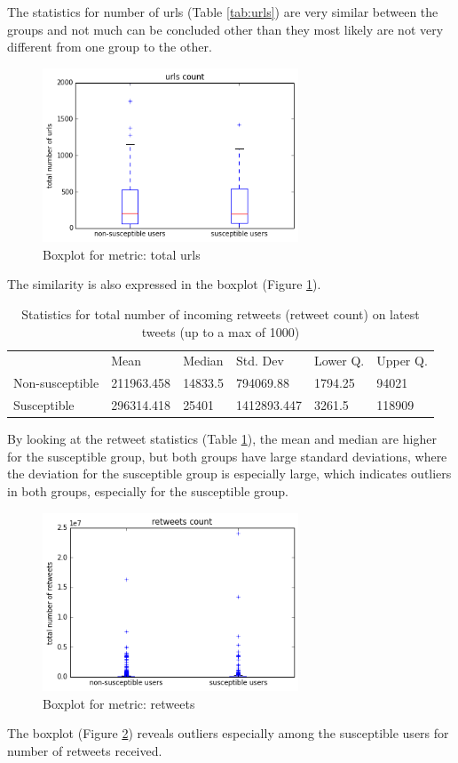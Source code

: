 \documentclass[10pt]{IEEEtran}
\begin{document}
The statistics for number of urls (Table \ref{tab:urls}) are very similar between the groups and not much can be concluded other than they most likely are not very different from one group to the other.
\begin{figure}[H]
  \centering
  \includegraphics[width=3.0in]{total_urls_boxplot}
  \caption{Boxplot for metric: total urls}
  \label{fig:total_urls_boxplot}
\end{figure}
The similarity is also expressed in the boxplot (Figure \ref{fig:total_urls_boxplot}).
\begin{table}[H]

\begin{tabular}{llllll}
\textbf{}       & Mean       & Median  & Std. Dev    & Lower Q. & Upper Q. \\
Non-susceptible & 211963.458 & 14833.5 & 794069.88   & 1794.25    & 94021  \\
Susceptible     & 296314.418 & 25401   & 1412893.447 & 3261.5   &  118909 
\end{tabular}
\caption{Statistics for total number of incoming retweets (retweet count) on latest tweets (up to a max of 1000)}
\label{tab:retweets}
\end{table}
By looking at the retweet statistics (Table \ref{tab:retweets}), the mean and median are higher for the susceptible group, but both groups have large standard deviations, where the deviation for the susceptible group is especially large, which indicates outliers in both groups, especially for the susceptible group.
\begin{figure}[H]
  \centering
  \includegraphics[width=3.0in]{retweets_boxplot}
  \caption{Boxplot for metric: retweets}
  \label{fig:retweets_boxplot}
\end{figure}
The boxplot (Figure \ref{fig:retweets_boxplot}) reveals outliers especially among the susceptible users for number of retweets received.
\\\\
\end{document}
